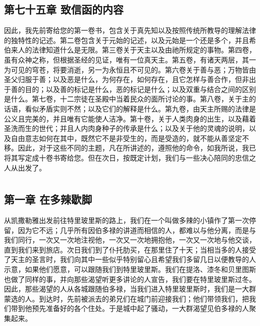 \subsection{第七十五章 致信函的内容}

因此，我先前寄给您的第一卷书，包含关于真先知以及按照传统所教导的理解法律的独特性的记述。第二卷包含关于元始的记述，以及元始是一个还是多个，并且希伯来人的法律知道什么是无限。第三卷关于天主以及由祂所规定的事物。第四卷，虽有众神之称，但根据圣经的见证，唯有一位真天主。第五卷，有诸天两层，其一为可见的穹苍，将要消逝，另一为永恒且不可见的。第六卷关于善与恶；万物皆由圣父归服于善；以及恶是什么，为何存在，如何存在，且它怎样与善合作，但非出于善的目的；以及善的标记是什么，恶的标记是什么；以及双重与结合之间的区别是什么。第七卷，十二宗徒在圣殿中当着民众的面所讨论的事。第八卷，关于主的话语，看似矛盾实则不然；以及它们的解释是什么。第九卷，由天主所赐的法律是公义且完美的，并且唯有它能使人洁净。第十卷，关于人类肉身的出生，以及藉着圣洗而生的世代；并且人内肉身种子的传承是什么；以及关于他的灵魂的说明，以及自由意志如何在其中，既然它不是非受生的，而是受造的，就不能从善坚定不移。因此，对于这些不同的主题，凡在所讲述的，遵照他的命令，如我所说，我已将其写定成十卷书寄给您。但在次日，按既定计划，我们与一些决心陪同的忠信之人从出发了。\par



\section{}


\subsection{第一章 在多辣歇脚}

从凯撒勒雅出发前往特里玻里斯的路上，我们在一个叫做多辣的小镇作了第一次停留，因为它不远；几乎所有因伯多禄的讲道而相信的人，都难以与他分离，而是与我们同行，一次又一次地注视他，一次又一次地拥抱他，一次又一次地与他交谈，直到我们来到旅店。次日我们到了仆托肋买，在那里住了十天；当相当多的人接受了天主的圣言时，我们向其中一些似乎特别留心且希望我们多留几日以便教导的人示意，如果他们愿意，可以跟随我们到特里玻里斯。我们在提洛、漆冬和贝里图斯也做了同样的事，并向那些渴望听更多讲论的人宣告，我们要在特里玻里斯过冬。因此，那些渴望的人从各城跟随伯多禄，当我们进入特里玻里斯时，我们是一大群蒙选的人。到达时，先前被派去的弟兄们在城门前迎接我们；他们带领我们，把我们带到他预先准备好的各个住处。于是城中起了骚动，一大群渴望见伯多禄的人聚集起来。\par

